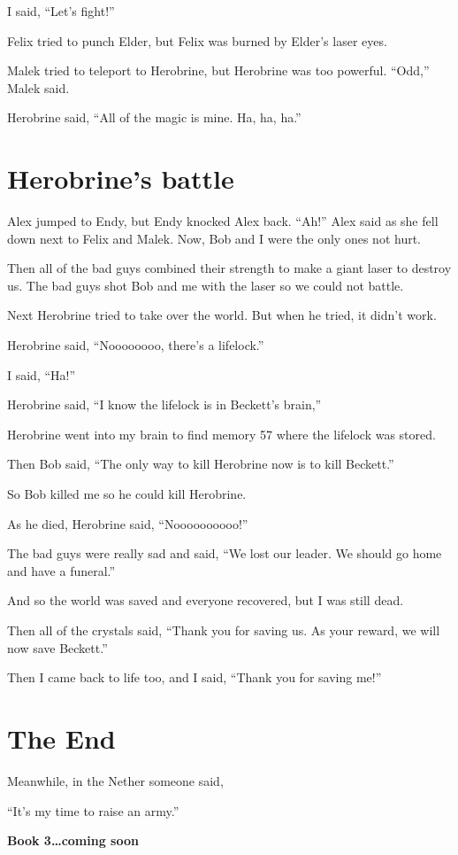 \documentclass[oneside]{book}
\begin{document}
I said, ``Let's fight!''

Felix tried to punch Elder, but Felix was burned by Elder's laser eyes.

Malek tried to teleport to Herobrine, but Herobrine was too powerful.
``Odd,'' Malek said.

Herobrine said, ``All of the magic is mine. Ha, ha, ha.''

\chapter{Herobrine's battle}\label{herobrines-battle}

Alex jumped to Endy, but Endy knocked Alex back. ``Ah!'' Alex said as
she fell down next to Felix and Malek. Now, Bob and I were the only ones
not hurt.

Then all of the bad guys combined their strength to make a giant laser
to destroy us. The bad guys shot Bob and me with the laser so we could
not battle.

Next Herobrine tried to take over the world. But when he tried, it
didn't work.

Herobrine said, ``Noooooooo, there's a lifelock.''

I said, ``Ha!''

Herobrine said, ``I know the lifelock is in Beckett's brain,''

Herobrine went into my brain to find memory 57 where the lifelock was
stored.

Then Bob said, ``The only way to kill Herobrine now is to kill
Beckett.''

So Bob killed me so he could kill Herobrine.

As he died, Herobrine said, ``Noooooooooo!''

The bad guys were really sad and said, ``We lost our leader. We should
go home and have a funeral.''

And so the world was saved and everyone recovered, but I was still dead.

Then all of the crystals said, ``Thank you for saving us. As your
reward, we will now save Beckett.''

Then I came back to life too, and I said, ``Thank you for saving me!''

\chapter*{The End}\label{the-end}

Meanwhile, in the Nether someone said,

``It's my time to raise an army.''

\textbf{Book 3\ldots{}coming soon}
\end{document}
